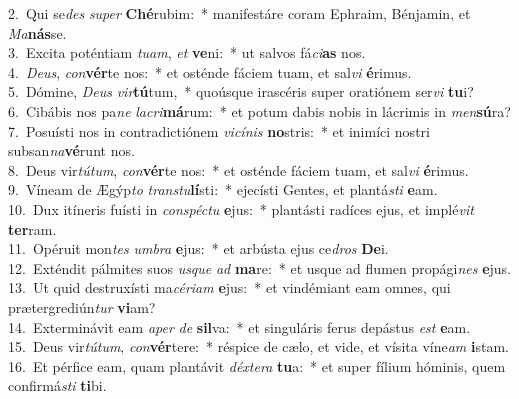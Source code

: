 {2.~}Qui se\textit{des} \textit{su}\textit{per} \textbf{Ché}rubim:~* manifestáre coram Ephraim, Bénjamin, et \textit{Ma}\textbf{nás}se.\\
{3.~}Excita poténtiam \textit{tu}\textit{am}, \textit{et} \textbf{ve}ni:~* ut salvos fá\textit{ci}\textbf{as} nos.\\
{4.~}\textit{De}\textit{us}, \textit{con}\textbf{vér}te nos:~* et osténde fáciem tuam, et sal\textit{vi} \textbf{é}rimus.\\
{5.~}Dómine, \textit{De}\textit{us} \textit{vir}\textbf{tú}tum,~* quoúsque irascéris super oratiónem ser\textit{vi} \textbf{tu}i?\\
{6.~}Cibábis nos pa\textit{ne} \textit{la}\textit{cri}\textbf{má}rum:~* et potum dabis nobis in lácrimis in \textit{men}\textbf{sú}ra?\\
{7.~}Posuísti nos in contradictiónem \textit{vi}\textit{cí}\textit{nis} \textbf{no}stris:~* et inimíci nostri subsan\textit{na}\textbf{vé}runt nos.\\
{8.~}Deus vir\textit{tú}\textit{tum}, \textit{con}\textbf{vér}te nos:~* et osténde fáciem tuam, et sal\textit{vi} \textbf{é}rimus.\\
{9.~}Víneam de Ægýp\textit{to} \textit{tran}\textit{stu}\textbf{lí}sti:~* ejecísti Gentes, et plantá\textit{sti} \textbf{e}am.\\
{10.~}Dux itíneris fuísti in \textit{con}\textit{spé}\textit{ctu} \textbf{e}jus:~* plantásti radíces ejus, et implé\textit{vit} \textbf{ter}ram.\\
{11.~}Opéruit mon\textit{tes} \textit{um}\textit{bra} \textbf{e}jus:~* et arbústa ejus ce\textit{dros} \textbf{De}i.\\
{12.~}Exténdit pálmites suos \textit{us}\textit{que} \textit{ad} \textbf{ma}re:~* et usque ad flumen propági\textit{nes} \textbf{e}jus.\\
{13.~}Ut quid destruxísti ma\textit{cé}\textit{ri}\textit{am} \textbf{e}jus:~* et vindémiant eam omnes, qui prætergrediún\textit{tur} \textbf{vi}am?\\
{14.~}Exterminávit eam \textit{a}\textit{per} \textit{de} \textbf{sil}va:~* et singuláris ferus depástus \textit{est} \textbf{e}am.\\
{15.~}Deus vir\textit{tú}\textit{tum}, \textit{con}\textbf{vér}tere:~* réspice de cælo, et vide, et vísita víne\textit{am} \textbf{i}stam.\\
{16.~}Et pérfice eam, quam plantávit \textit{déx}\textit{te}\textit{ra} \textbf{tu}a:~* et super fílium hóminis, quem confirmá\textit{sti} \textbf{ti}bi.\\
